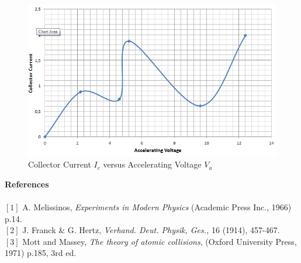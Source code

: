 \documentclass[a4paper,12pt]{article}
\begin{document}
\begin{figure}[h!]
\centering
\includegraphics[width=0.85\linewidth, height=0.35\textheight]{Capture}
\caption{Collector Current $I_{c}$ versus Accelerating Voltage $V_{a}$}
\label{fig:Capture}
\end{figure}

\textbf{References}\\\\
$[1]$ A. Melissinos, \textit{Experiments in Modern Physics} (Academic
Press Inc., 1966) p.14.\\
$[2]$ J. Franck \& G. Hertz, \textit{Verhand. Deut. Physik, Ges.,} 16 (1914), 457-467.\\
$[3]$ Mott and Massey, \textit{The theory of atomic collisions},
(Oxford University Press, 1971) p.185, 3rd ed.\\
\end{document}
